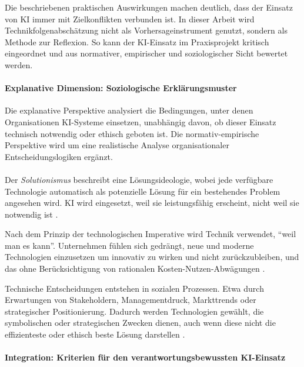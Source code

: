 Die beschriebenen praktischen Auswirkungen machen deutlich, dass der Einsatz von KI immer mit Zielkonflikten verbunden ist. In dieser Arbeit wird Technikfolgenabschätzung nicht als Vorhersageinstrument genutzt, sondern als Methode zur Reflexion. So kann der KI-Einsatz im Praxisprojekt kritisch eingeordnet und aus normativer, empirischer und soziologischer Sicht bewertet werden.

\paragraph{Explanative Dimension: Soziologische Erklärungsmuster}
Die explanative Perspektive analysiert die Bedingungen, unter denen Organisationen KI-Systeme einsetzen, unabhängig davon, ob dieser Einsatz technisch notwendig oder ethisch geboten ist. Die normativ-empirische Perspektive wird um eine realistische Analyse organisationaler Entscheidungslogiken ergänzt.

\paragraph{}

Der \textit{Solutionismus} beschreibt eine Lösungsideologie, wobei jede verfügbare Technologie automatisch als potenzielle Lösung für ein bestehendes Problem angesehen wird. KI wird eingesetzt, weil sie leistungsfähig erscheint, nicht weil sie notwendig ist \cite{bardzellShaowenBardzell2017} \cite{lindgrenIntroducingCriticalStudies2023}.

Nach dem Prinzip der technologischen Imperative wird Technik verwendet, \enquote{weil man es kann}. Unternehmen fühlen sich gedrängt, neue und moderne Technologien einzusetzen um innovativ zu wirken und nicht zurückzubleiben, und das ohne Berücksichtigung von rationalen Kosten-Nutzen-Abwägungen \cite{kasneciEuropesAIImperative2025}.

Technische Entscheidungen entstehen in sozialen Prozessen. Etwa durch Erwartungen von Stakeholdern, Managementdruck, Markttrends oder strategischer Positionierung. Dadurch werden Technologien gewählt, die symbolischen oder strategischen Zwecken dienen, auch wenn diese nicht die effizienteste oder ethisch beste Lösung darstellen \cite{dimaggioIronCageRevisited1983}.

\paragraph{Integration: Kriterien für den verantwortungsbewussten KI-Einsatz}

